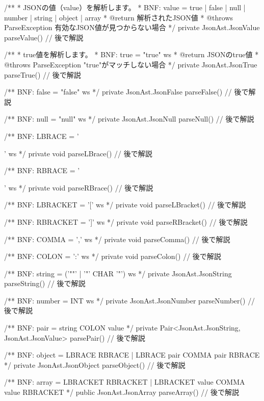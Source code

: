 \begin{codescreen}{}
{    /**
     * JSONの値（value）を解析します。
     * BNF: value = true | false | null | number | string | object | array
     * @return 解析されたJSON値
     * @throws ParseException 有効なJSON値が見つからない場合
     */
    private JsonAst.JsonValue parseValue() {
        // 後で解説
    }

  
    /**
     * true値を解析します。
     * BNF: true = "true" ws
     * @return JSONのtrue値
     * @throws ParseException "true"がマッチしない場合
     */
    private JsonAst.JsonTrue parseTrue() {
        // 後で解説
    }

    /** BNF: false = "false" ws */
    private JsonAst.JsonFalse parseFalse() {
        // 後で解説
    }

    /** BNF: null = "null" ws */
    private JsonAst.JsonNull parseNull() {
        // 後で解説
    }

    /** BNF: LBRACE = '{' ws */
    private void parseLBrace() {
        // 後で解説
    }

    /** BNF: RBRACE = '}' ws */
    private void parseRBrace() {
        // 後で解説
    }

    /** BNF: LBRACKET = '[' ws */
    private void parseLBracket() {
        // 後で解説
    }

    /** BNF: RBRACKET = ']' ws */
    private void parseRBracket() {
        // 後で解説
    }

    /** BNF: COMMA = ',' ws */
    private void parseComma() {
        // 後で解説
    }

    /** BNF: COLON = ':' ws */
    private void parseColon() {
        // 後で解説
    }

    /** BNF: string = ('""' | '"' {CHAR} '"') ws */
    private JsonAst.JsonString parseString() {
        // 後で解説
    }

    /** BNF: number = INT ws */
    private JsonAst.JsonNumber parseNumber() {
        // 後で解説
    }

    /** BNF: pair = string COLON value */
    private Pair<JsonAst.JsonString, JsonAst.JsonValue> parsePair() {
        // 後で解説
    }

    /** BNF: object = LBRACE RBRACE | LBRACE pair {COMMA pair} RBRACE */
    private JsonAst.JsonObject parseObject() {
        // 後で解説
    }

    /** BNF: array = LBRACKET RBRACKET | LBRACKET value {COMMA value} RBRACKET */
    public JsonAst.JsonArray parseArray() {
        // 後で解説
    }
}
\end{codescreen}

